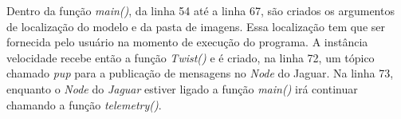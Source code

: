 Dentro da função \textit{main()}, da linha 54 até a linha 67, são criados os argumentos de localização do modelo e da pasta de imagens. Essa localização tem que ser fornecida pelo usuário na momento de execução do programa. A instância velocidade recebe então a função \textit{Twist()} e é criado, na linha 72, um tópico chamado \textit{pup} para a publicação de mensagens no \textit{Node} do Jaguar. Na linha 73, enquanto o \textit{Node} do \textit{Jaguar} estiver ligado a função \textit{main()} irá continuar chamando a função \textit{telemetry()}.